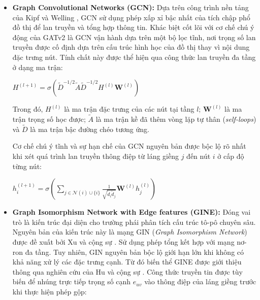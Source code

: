 \begin{itemize}[label={--}, itemsep=5pt]
\begin{itemize}[label={+}, itemsep=2pt]
        Trong đó $\mathbf{W}_v$ là ma trận trọng số đặc trưng học được.
        
        \item Mô hình tích hợp \textit{Multi-head Attention} tương tự Transformer \cite{vaswani2017attention} để ổn định quá trình học, thực hiện ghép nối ở tầng ẩn và lấy trung bình ở tầng đầu ra.
    \end{itemize}

    \item \textbf{Graph Convolutional Networks (GCN):} Dựa trên công trình nền tảng của Kipf và Welling \cite{kipf2017semi}, GCN sử dụng phép xấp xỉ bậc nhất của tích chập phổ đồ thị để lan truyền và tổng hợp thông tin. Khác biệt cốt lõi với cơ chế chú ý động của GATv2 là GCN vận hành dựa trên một bộ lọc tĩnh, nơi trọng số lan truyền được cố định dựa trên cấu trúc hình học của đồ thị thay vì nội dung đặc trưng nút. Tính chất này được thể hiện qua công thức lan truyền đa tầng ở dạng ma trận:

    \begin{center}
    \(
        H^{(l+1)} = \sigma\left( \tilde{D}^{-1/2} \tilde{A} \tilde{D}^{-1/2} H^{(l)} \mathbf{W}^{(l)} \right)
    \)
    \end{center}

    Trong đó, $H^{(l)}$ là ma trận đặc trưng của các nút tại tầng $l$; $\mathbf{W}^{(l)}$ là ma trận trọng số học được; $\tilde{A}$ là ma trận kề đã thêm vòng lặp tự thân (\textit{self-loops}) và $\tilde{D}$ là ma trận bậc đường chéo tương ứng.\vspace{0.3cm}

    Cơ chế chú ý tĩnh và sự hạn chế của GCN nguyên bản được bộc lộ rõ nhất khi xét quá trình lan truyền thông điệp từ láng giềng $j$ đến nút $i$ ở cấp độ từng nút:

    \begin{center}
    \(
        h_i^{(l+1)} = \sigma \left( \sum_{j \in \mathcal{N}(i) \cup \{i\}} \frac{1}{\sqrt{\tilde{d}_i \tilde{d}_j}} \mathbf{W}^{(l)} h_j^{(l)} \right)
    \)
    \end{center}

    \item \textbf{Graph Isomorphism Network with Edge features (GINE):} Đóng vai trò là kiến trúc đại diện cho trường phái phân tích cấu trúc tô-pô chuyên sâu. Nguyên bản của kiến trúc này là mạng GIN (\textit{Graph Isomorphism Network}) được đề xuất bởi Xu và cộng sự \cite{xu2018powerful}. Sử dụng phép tổng kết hợp với mạng nơ-ron đa tầng. Tuy nhiên, GIN nguyên bản bộc lộ giới hạn lớn khi không có khả năng xử lý các đặc trưng cạnh. Từ đó biến thể GINE được giới thiệu thông qua nghiên cứu của Hu và cộng sự \cite{hu2019strategies}. Công thức truyền tin được tùy biến để nhúng trực tiếp trọng số cạnh $e_{uv}$ vào thông điệp của láng giềng trước khi thực hiện phép gộp:


\end{itemize}
